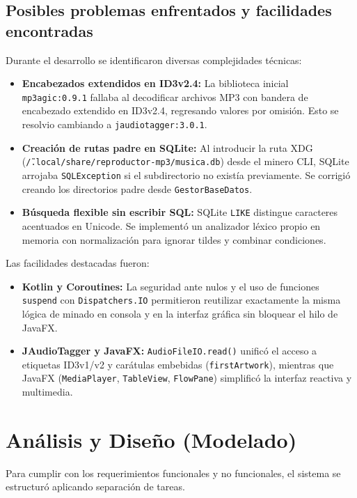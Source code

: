 \documentclass[12pt,a4paper]{article}
\begin{document}
\subsection{Posibles problemas enfrentados y facilidades encontradas}
Durante el desarrollo se identificaron diversas complejidades técnicas:
\begin{itemize}
    \item \textbf{Encabezados extendidos en ID3v2.4:} La biblioteca inicial \texttt{mp3agic:0.9.1} fallaba al decodificar archivos MP3 con bandera de encabezado extendido en ID3v2.4, regresando valores por omisión. Esto se resolvio cambiando a \texttt{jaudiotagger:3.0.1}.
    \item \textbf{Creación de rutas padre en SQLite:} Al introducir la ruta XDG (\texttt{\~/.local/share/reproductor-mp3/musica.db}) desde el minero CLI, SQLite arrojaba \texttt{SQLException} si el subdirectorio no existía previamente. Se corrigió creando los directorios padre desde \texttt{GestorBaseDatos}.
    \item \textbf{Búsqueda flexible sin escribir SQL:} SQLite \texttt{LIKE} distingue caracteres acentuados en Unicode. Se implementó un analizador léxico propio en memoria con normalización para ignorar tildes y combinar condiciones.
\end{itemize}
Las facilidades destacadas fueron:
\begin{itemize}
    \item \textbf{Kotlin y Coroutines:} La seguridad ante nulos y el uso de funciones \texttt{suspend} con \texttt{Dispatchers.IO} permitieron reutilizar exactamente la misma lógica de minado en consola y en la interfaz gráfica sin bloquear el hilo de JavaFX.
    \item \textbf{JAudioTagger y JavaFX:} \texttt{AudioFileIO.read()} unificó el acceso a etiquetas ID3v1/v2 y carátulas embebidas (\texttt{firstArtwork}), mientras que JavaFX (\texttt{MediaPlayer}, \texttt{TableView}, \texttt{FlowPane}) simplificó la interfaz reactiva y multimedia.
\end{itemize}

\section{Análisis y Diseño (Modelado)}
Para cumplir con los requerimientos funcionales y no funcionales, el sistema se estructuró aplicando separación de tareas.
\end{document}
